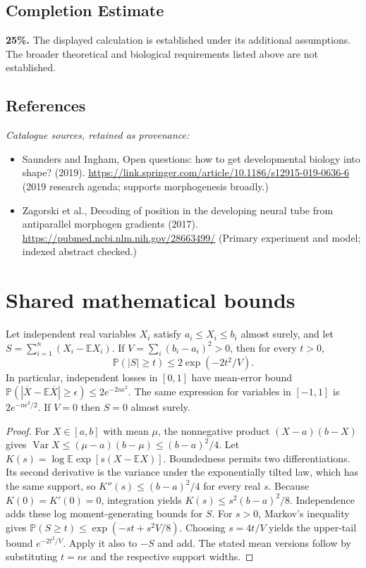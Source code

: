 \documentclass[11pt]{article}
\begin{document}
\subsection{Completion Estimate}
\textbf{25\%.} The displayed calculation is established under its additional assumptions. The broader theoretical and biological requirements listed above are not established.
\subsection{References}
\noindent\emph{Catalogue sources, retained as provenance:}
\begin{itemize}
\item Saunders and Ingham, Open questions: how to get developmental biology into shape? (2019). \url{https://link.springer.com/article/10.1186/s12915-019-0636-6} (2019 research agenda; supports morphogenesis broadly.)
\item Zagorski et al., Decoding of position in the developing neural tube from antiparallel morphogen gradients (2017). \url{https://pubmed.ncbi.nlm.nih.gov/28663499/} (Primary experiment and model; indexed abstract checked.)
\end{itemize}




\section{Shared mathematical bounds}\label{app:bounds}
\begin{lemma}\label{lem:bounded}
Let independent real variables $X_i$ satisfy $a_i\leq X_i\leq b_i$ almost surely,
and let $S=\sum_{i=1}^n(X_i-\mathbb{E} X_i)$. If
$V=\sum_i(b_i-a_i)^2>0$, then for every $t>0$,
\[
 \mathbb{P}(|S|\geq t)\leq 2\exp(-2t^2/V).
\]
In particular, independent losses in $[0,1]$ have mean-error bound
$\mathbb{P}(|\overline X-\mathbb{E}\overline X|\geq\epsilon)
\leq2e^{-2n\epsilon^2}$. The same expression for variables in $[-1,1]$
is $2e^{-n\epsilon^2/2}$. If $V=0$ then $S=0$ almost surely.
\end{lemma}
\begin{proof}
For $X\in[a,b]$ with mean $\mu$, the nonnegative product
$(X-a)(b-X)$ gives
$\operatorname{Var} X\leq(\mu-a)(b-\mu)\leq(b-a)^2/4$.
Let $K(s)=\log\mathbb{E}\exp[s(X-\mathbb{E} X)]$.
Boundedness permits two differentiations. Its second derivative is the variance
under the exponentially tilted law, which has the same support, so
$K''(s)\leq(b-a)^2/4$ for every real $s$.
Because $K(0)=K'(0)=0$, integration yields
$K(s)\leq s^2(b-a)^2/8$.
Independence adds these log moment-generating bounds for $S$.
For $s>0$, Markov's inequality gives
$\mathbb{P}(S\geq t)\leq\exp(-st+s^2V/8)$.
Choosing $s=4t/V$ yields the upper-tail bound $e^{-2t^2/V}$.
Apply it also to $-S$ and add. The stated mean versions follow by substituting
$t=n\epsilon$ and the respective support widths.
\end{proof}
\end{document}
